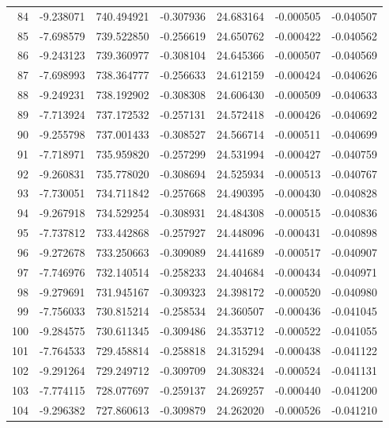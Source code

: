 \begin{tabular}{rrrrrrr}
  84 &  -9.238071 &  740.494921 & -0.307936 &  24.683164 &  -0.000505 & -0.040507 \\
  85 &  -7.698579 &  739.522850 & -0.256619 &  24.650762 &  -0.000422 & -0.040562 \\
  86 &  -9.243123 &  739.360977 & -0.308104 &  24.645366 &  -0.000507 & -0.040569 \\
  87 &  -7.698993 &  738.364777 & -0.256633 &  24.612159 &  -0.000424 & -0.040626 \\
  88 &  -9.249231 &  738.192902 & -0.308308 &  24.606430 &  -0.000509 & -0.040633 \\
  89 &  -7.713924 &  737.172532 & -0.257131 &  24.572418 &  -0.000426 & -0.040692 \\
  90 &  -9.255798 &  737.001433 & -0.308527 &  24.566714 &  -0.000511 & -0.040699 \\
  91 &  -7.718971 &  735.959820 & -0.257299 &  24.531994 &  -0.000427 & -0.040759 \\
  92 &  -9.260831 &  735.778020 & -0.308694 &  24.525934 &  -0.000513 & -0.040767 \\
  93 &  -7.730051 &  734.711842 & -0.257668 &  24.490395 &  -0.000430 & -0.040828 \\
  94 &  -9.267918 &  734.529254 & -0.308931 &  24.484308 &  -0.000515 & -0.040836 \\
  95 &  -7.737812 &  733.442868 & -0.257927 &  24.448096 &  -0.000431 & -0.040898 \\
  96 &  -9.272678 &  733.250663 & -0.309089 &  24.441689 &  -0.000517 & -0.040907 \\
  97 &  -7.746976 &  732.140514 & -0.258233 &  24.404684 &  -0.000434 & -0.040971 \\
  98 &  -9.279691 &  731.945167 & -0.309323 &  24.398172 &  -0.000520 & -0.040980 \\
  99 &  -7.756033 &  730.815214 & -0.258534 &  24.360507 &  -0.000436 & -0.041045 \\
 100 &  -9.284575 &  730.611345 & -0.309486 &  24.353712 &  -0.000522 & -0.041055 \\
 101 &  -7.764533 &  729.458814 & -0.258818 &  24.315294 &  -0.000438 & -0.041122 \\
 102 &  -9.291264 &  729.249712 & -0.309709 &  24.308324 &  -0.000524 & -0.041131 \\
 103 &  -7.774115 &  728.077697 & -0.259137 &  24.269257 &  -0.000440 & -0.041200 \\
 104 &  -9.296382 &  727.860613 & -0.309879 &  24.262020 &  -0.000526 & -0.041210 \\

\end{tabular}
